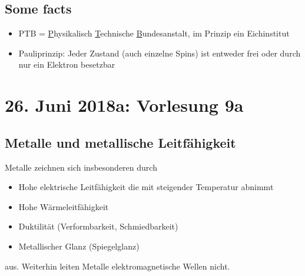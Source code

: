 \documentclass[12pt,a4paper]{report}%
\numberwithin{equation}{section}
\def\ul#1{\underline{#1}}
\numberwithin{equation}{subsection}
\begin{document}
		\subsection{Some facts}
		\begin{itemize}
		  \item PTB = \ul{P}hysikalisch \ul{T}echnische \ul{B}undesanstalt, im Prinzip ein Eichinstitut
		  \item Pauliprinzip: Jeder Zustand (auch einzelne Spins) ist entweder frei oder durch nur ein Elektron besetzbar
		\end{itemize}
\newpage

	\section{26. Juni 2018a: Vorlesung 9a}
		\subsection{Metalle und metallische Leitfähigkeit}
		Metalle zeichnen sich insbesonderen durch
		\begin{itemize}
		  \item Hohe elektrische Leitfähigkeit die mit steigender Temperatur abnimmt
		  \item Hohe Wärmeleitfähigkeit
		  \item Duktilität (Verformbarkeit, Schmiedbarkeit)
		  \item Metallischer Glanz (Spiegelglanz)
		\end{itemize}
		aus.
		Weiterhin leiten Metalle elektromagnetische Wellen nicht.
		
\end{document}
